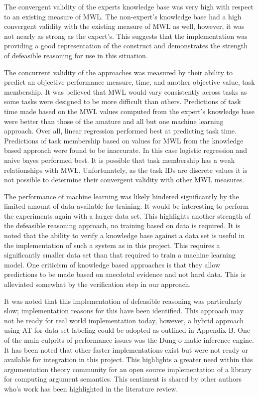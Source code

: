 The convergent validity of the experts knowledge base was very high with respect to an existing measure of MWL. The non-expert's knowledge base had a high convergent validity with the existing measure of MWL as well, however, it was not nearly as strong as the expert's. This suggests that the implementation was providing a good representation of the construct and demonstrates the strength of defeasible reasoning for use in this situation.

The concurrent validity of the approaches was measured by their ability to predict an objective performance measure, time, and another objective value, task membership. It was believed that MWL would vary consistently across tasks as some tasks were designed to be more difficult than others. Predictions of task time made based on the MWL values computed from the expert's knowledge base were better than those of the amature and all but one machine learning approach. Over all, linear regression performed best at predicting task time. Predictions of task membership based on values for MWL from the knowledge based approach were found to be inaccurate. In this case logistic regression and naive bayes performed best. It is possible that task membership has a weak relationships with MWL. Unfortunately, as the task IDs are discrete values it is not possible to determine their convergent validity with other MWL measures. 

The performance of machine learning was likely hindered significantly by the limited amount of data available for training. It would be interesting to perform the experiments again with a larger data set. This highlights another strength of the defeasible reasoning approach, no training based on data is required. It is noted that the ability to verify a knowledge base against a data set is useful in the implementation of such a system as in this project. This requires a significantly smaller data set than that required to train a machine learning model. One criticism of knowledge based approaches is that they allow predictions to be made based on anecdotal evidence and not hard data. This is alleviated somewhat by the verification step in our approach. 

It was noted that this implementation of defeasible reasoning was particularly slow; implementation reasons for this have been identified. This approach may not be ready for real world implementation today, however, a hybrid approach using AT for data set labeling could be adopted as outlined in Appendix B. One of the main culprits of performance issues was the Dung-o-matic inference engine. It has been noted that other faster implementations exist but were not ready or available for integration in this project. This highlights a greater need within this argumentation theory community for an open source implementation of a library for computing argument semantics. This sentiment is shared by other authors who's work has been highlighted in the literature review.


